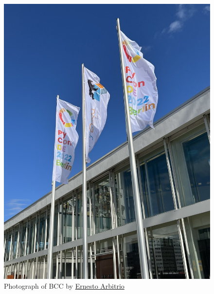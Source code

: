    \begin{figure}[hb]
        \centering
        \includegraphics[width=0.45\linewidth]{Images/02_pyCon.jpeg}
        \caption{Photograph of BCC by \href{https://twitter.com/__pamaron__}{Ernesto Arbitrio}}
        \label{fig:pycon}
    \end{figure}
    
    

